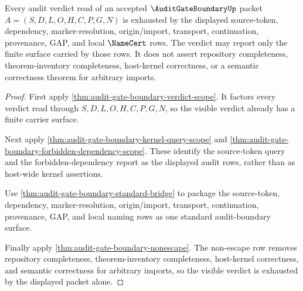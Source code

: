 \begin{theorem}
\label{thm:audit-gate-boundary-visible-verdict-exhaustion}
Every audit verdict read of an accepted $\AuditGateBoundaryUp$ packet
$A=(S,D,L,O,H,C,P,G,N)$ is exhausted by the displayed source-token,
dependency, marker-resolution, origin/import, transport, continuation,
provenance, GAP, and local $\NameCert$ rows. The verdict may report only the
finite surface carried by those rows. It does not assert repository
completeness, theorem-inventory completeness, host-kernel correctness, or a
semantic correctness theorem for arbitrary imports.
\end{theorem}
\begin{proof}
First apply \autoref{thm:audit-gate-boundary-verdict-scope}. It factors every
verdict read through $S,D,L,O,H,C,P,G,N$, so the visible verdict already has a
finite carrier surface.

Next apply \autoref{thm:audit-gate-boundary-kernel-query-scope} and
\autoref{thm:audit-gate-boundary-forbidden-dependency-scope}. These identify
the source-token query and the forbidden-dependency report as the displayed
audit rows, rather than as host-wide kernel assertions.

Use \autoref{thm:audit-gate-boundary-standard-bridge} to package the
source-token, dependency, marker-resolution, origin/import, transport,
continuation, provenance, GAP, and local naming rows as one standard
audit-boundary surface.

Finally apply \autoref{thm:audit-gate-boundary-nonescape}. The non-escape row
removes repository completeness, theorem-inventory completeness,
host-kernel correctness, and semantic correctness for arbitrary imports, so the
visible verdict is exhausted by the displayed packet alone.
\end{proof}

